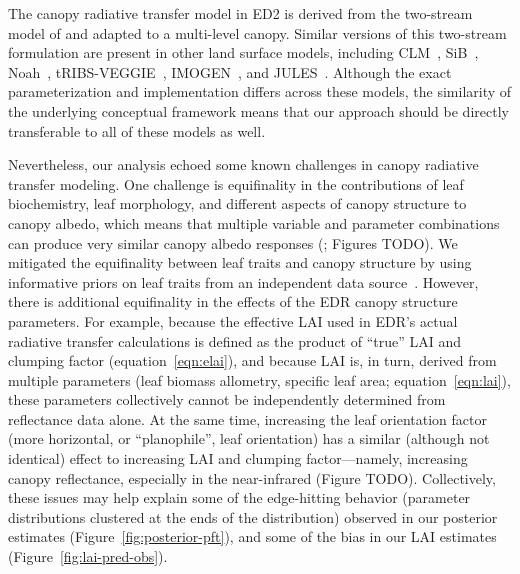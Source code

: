 The canopy radiative transfer model in ED2 is derived from the two-stream model of \citet{sellers1985canopy} and adapted to a multi-level canopy.
Similar versions of this two-stream formulation are present in other land surface models, including CLM~\citep{clm45_note}, SiB~\citep{baker2008seasonal}, Noah~\citep{niu2011community}, tRIBS-VEGGIE~\citep{ivanov2008vegetationhydrology}, IMOGEN~\citep{huntingford2008quantifying}, and JULES~\citep{best_2011_joint}.
Although the exact parameterization and implementation differs across these models, the similarity of the underlying conceptual framework means that our approach should be directly transferable to all of these models as well.

Nevertheless, our analysis echoed some known challenges in canopy radiative transfer modeling.
One challenge is equifinality in the contributions of leaf biochemistry, leaf morphology, and different aspects of canopy structure to canopy albedo, which means that multiple variable and parameter combinations can produce very similar canopy albedo responses (\citealt{lewis2007spectral}; Figures TODO).
We mitigated the equifinality between leaf traits and canopy structure by using informative priors on leaf traits from an independent data source~\citep{shiklomanov_dissertation}.
However, there is additional equifinality in the effects of the EDR canopy structure parameters.
For example, because the effective LAI used in EDR’s actual radiative transfer calculations is defined as the product of ``true'' LAI and clumping factor (equation~\ref{eqn:elai}), and because LAI is, in turn, derived from multiple parameters (leaf biomass allometry, specific leaf area; equation~\ref{eqn:lai}), these parameters collectively cannot be independently determined from reflectance data alone.
At the same time, increasing the leaf orientation factor (more horizontal, or ``planophile'', leaf orientation) has a similar (although not identical) effect to increasing LAI and clumping factor---namely, increasing canopy reflectance, especially in the near-infrared (Figure TODO).
Collectively, these issues may help explain some of the edge-hitting behavior (parameter distributions clustered at the ends of the distribution) observed in our posterior estimates (Figure~\ref{fig:posterior-pft}), and some of the bias in our LAI estimates (Figure~\ref{fig:lai-pred-obs}).

